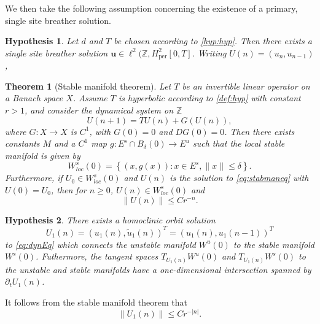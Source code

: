 \documentclass[12pt,reqno]{amsart}
\def\Z{{\mathbb Z}}
\def\per{\textrm{per}}
\newcommand{\uvec}{\mathbf{u}}
\newtheorem{theorem}{Theorem}
\newtheorem{hypothesis}{Hypothesis}
\begin{document}
We then take the following assumption concerning the existence of a primary, single site breather solution.
\begin{hypothesis}\label{hyp:breather}
Let $d$ and $T$ be chosen according to \cref{hyp:hyp}. Then there exists a single site breather solution $\uvec \in \ell^2(\Z,H^2_\per[0,T]$. Writing $U(n) = (u_n, u_{n-1})$, 
\end{hypothesis}

\begin{theorem}[Stable manifold theorem]\label{th:stabman}
Let $T$ be an invertible linear operator on a Banach space $X$. Assume $T$ is hyperbolic according to \cref{def:hyp} with constant $r>1$, and consider the dynamical system on $\Z$
\begin{equation}\label{eq:stabmaneq}
U(n+1) = T U(n) + G(U(n)),
\end{equation}
where $G: X \rightarrow X$ is $C^1$, with $G(0) = 0$ and $DG(0) = 0$.
Then there exists constants $M$ and a $C^1$ map $g: E^s \cap B_\delta(0) \rightarrow E^u$ such that the local stable manifold is given by
\[
W^s_{loc}(0) = \left\{ (x, g(x)) : x \in E^s, \|x\|\leq \delta \right\}.
\]
Furthermore, if $U_0 \in W^s_{loc}(0)$ and $U(n)$ is the solution to \cref{eq:stabmaneq} with $U(0) = U_0$, then for $n \geq 0$, $U(n) \in W^s_{loc}(0)$ and
\[
\| U(n) \| \leq C r^{-n}.
\]
\end{theorem}

\begin{hypothesis}\label{hyp:breatherexists}
There exists a homoclinic orbit solution 
\[
U_1(n) = (u_1(n),\tilde{u}_1(n))^T = (u_1(n),u_1(n-1))^T
\]
to \cref{eq:dynEq} which connects the unstable manifold $W^u(0)$ to the stable manifold $W^s(0)$. Futhermore, the tangent spaces $T_{U_1(n)}W^u(0)$ and $T_{U_1(n)}W^s(0)$ to the unstable and stable manifolds have a one-dimensional intersection spanned by $\partial_t U_1(n)$.
\end{hypothesis}

It follows from the stable manifold theorem that
\begin{equation}\label{eq:U1decayest}
\|U_1(n)\| \leq C r^{-|n|}.
\end{equation}
\end{document}
